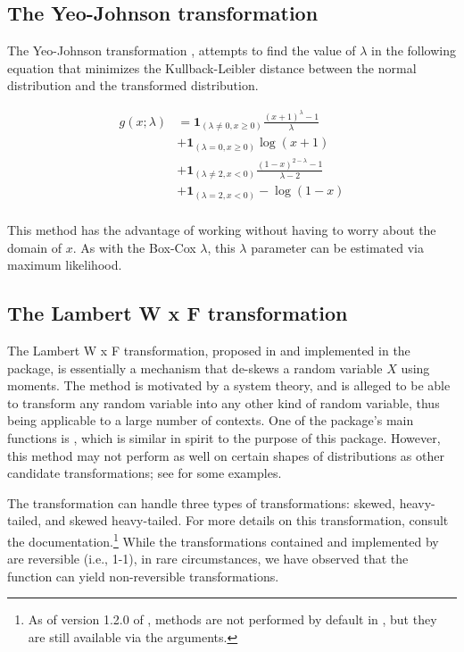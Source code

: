 \hypertarget{the-yeo-johnson-transformation}{%
\subsection{The Yeo-Johnson
transformation}\label{the-yeo-johnson-transformation}}

The Yeo-Johnson transformation \citep{yeojohnson}, attempts to find the
value of \(\lambda\) in the following equation that minimizes the
Kullback-Leibler distance between the normal distribution and the
transformed distribution.

\[
\begin{aligned}
g(x;\lambda) &= 
\boldsymbol 1 _{(\lambda \neq 0, x \geq 0)} \frac{(x+1)^\lambda-1}{\lambda} \\
&+ \boldsymbol 1_{(\lambda = 0, x \geq 0)} \log (x+1) \\
&+ \boldsymbol 1_{(\lambda \neq 2, x < 0)} \frac{(1-x)^{2-\lambda}-1}{\lambda - 2} \\
&+ \boldsymbol 1_{(\lambda = 2, x < 0)} -\log (1-x) \\
\end{aligned}
\]

This method has the advantage of working without having to worry about
the domain of \(x\). As with the Box-Cox \(\lambda\), this \(\lambda\)
parameter can be estimated via maximum likelihood.

\hypertarget{the-lambert-w-x-f-transformation}{%
\subsection{The Lambert W x F
transformation}\label{the-lambert-w-x-f-transformation}}

The Lambert W x F transformation, proposed in \citet{goerg2011} and
implemented in the  package, is essentially a
mechanism that de-skews a random variable \(X\) using moments. The
method is motivated by a system theory, and is alleged to be able to
transform any random variable into any other kind of random variable,
thus being applicable to a large number of contexts. One of the
package's main functions is , which is similar in
spirit to the purpose of this package. However, this method may not
perform as well on certain shapes of distributions as other candidate
transformations; see \citet{orq_paper} for some examples.

The  transformation can handle three types of
transformations: skewed, heavy-tailed, and skewed heavy-tailed. For more
details on this transformation, consult the 
documentation.\footnote{As of version 1.2.0 of ,  methods are not performed by default in , but they are still available via the  arguments.}
While the transformations contained and implemented by
 are reversible (i.e., 1-1), in rare circumstances,
we have observed that the  function can yield
non-reversible transformations.

